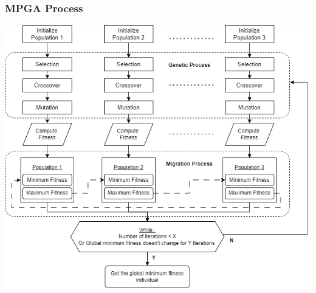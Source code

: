\documentclass{beamer}
\begin{document}
\begin{frame}
\frametitle{MPGA Process}
    \begin{center}
        \includegraphics[scale=0.38]{pic/MPGA.drawio.png}
    \end{center}
\end{frame}
\end{document}

